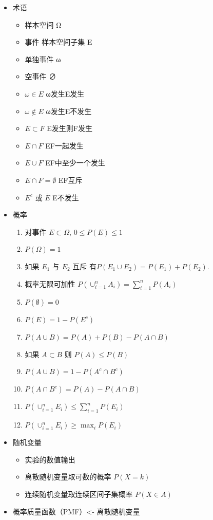 \documentclass[]{book}
\providecommand{\tightlist}{%
  \setlength{\itemsep}{0pt}\setlength{\parskip}{0pt}}
\begin{document}
\begin{itemize}
\tightlist
\item
  术语

  \begin{itemize}
  \tightlist
  \item
    样本空间 Ω
  \item
    事件 样本空间子集 E
  \item
    单独事件 ω
  \item
    空事件 ∅
  \item
    \(ω∈E\) ω发生E发生
  \item
    \(ω∉E\) ω发生E不发生
  \item
    \(E⊂F\) E发生则F发生
  \item
    \(E∩F\) EF一起发生
  \item
    \(E∪F\) EF中至少一个发生
  \item
    \(E∩F=∅\) EF互斥
  \item
    \(E^c\) 或 \(\bar E\) E不发生
  \end{itemize}
\item
  概率

  \begin{enumerate}
  \def\labelenumi{\arabic{enumi}.}
  \tightlist
  \item
    对事件 \(E\subset \Omega\), \(0 \leq P(E) \leq 1\)
  \item
    \(P(\Omega) = 1\)
  \item
    如果 \(E_1\) 与 \(E_2\) 互斥 有\(P(E_1 \cup E_2) = P(E_1) + P(E_2)\).
  \item
    概率无限可加性 \(P(\cup_{i=1}^n A_i) = \sum_{i=1}^n P(A_i)\)
  \item
    \(P(\emptyset) = 0\)
  \item
    \(P(E) = 1 - P(E^c)\)
  \item
    \(P(A \cup B) = P(A) + P(B) - P(A \cap B)\)
  \item
    如果 \(A \subset B\) 则 \(P(A) \leq P(B)\)
  \item
    \(P\left(A \cup B\right) = 1 - P(A^c \cap B^c)\)
  \item
    \(P(A \cap B^c) = P(A) - P(A \cap B)\)
  \item
    \(P(\cup_{i=1}^n E_i) \leq \sum_{i=1}^n P(E_i)\)
  \item
    \(P(\cup_{i=1}^n E_i) \geq \max_i P(E_i)\)
  \end{enumerate}
\item
  随机变量

  \begin{itemize}
  \tightlist
  \item
    实验的数值输出
  \item
    离散随机变量取可数的概率 \(P(X = k)\)
  \item
    连续随机变量取连续区间子集概率 \(P(X \in A)\)
  \end{itemize}
\item
  概率质量函数（PMF）\textless{}- 离散随机变量


\end{itemize}
\end{document}
